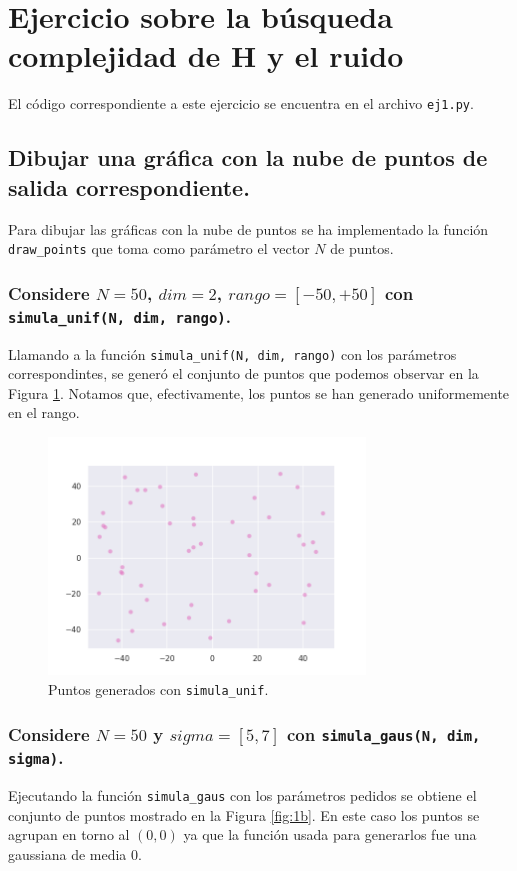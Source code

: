 \documentclass[a4paper, 20pt]{article}
\begin{document}
\large
\section{Ejercicio sobre la búsqueda complejidad de H y el ruido}
El código correspondiente a este ejercicio se encuentra en el archivo \texttt{ej1.py}.
\subsection{Dibujar una gráfica con la nube de puntos de salida correspondiente.}
Para dibujar las gráficas con la nube de puntos se ha implementado la función \texttt{draw\_points} que toma como parámetro el vector $N$ de puntos.
\subsubsection{Considere $N = 50$, $dim = 2$, $rango = [-50, +50]$ con \texttt{simula\_unif(N, dim, rango)}.}
Llamando a la función \texttt{simula\_unif(N, dim, rango)} con los parámetros correspondintes, se generó el conjunto de puntos que podemos observar en la Figura \ref{fig:1a}. Notamos que, efectivamente, los puntos se han generado uniformemente en el rango.

\begin{figure}[H]
    \centering
    \includegraphics[width=0.75\textwidth]{points1a}
    \caption{Puntos generados con \texttt{simula\_unif}.}
    \label{fig:1a}
\end{figure}

\subsubsection{Considere $N = 50$ y $sigma = [5,7]$ con \texttt{simula\_gaus(N, dim, sigma)}.}
Ejecutando la función \texttt{simula\_gaus} con los parámetros pedidos se obtiene el conjunto de puntos mostrado en la Figura \ref{fig:1b}. En este caso los puntos se agrupan en torno al $(0,0)$ ya que la función usada para generarlos fue una gaussiana de media 0.
\end{document}
